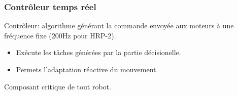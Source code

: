 \documentclass[14pt,utf8,hyperref={pdfpagelabels=false}]{beamer}
\begin{document}
\begin{slideAction}
  \frametitle{Contrôleur temps réel}


  \begin{changeleftmargin}{1.1cm}
  \begin{center}
    Contrôleur: algorithme générant la commande envoyée aux moteurs à
    une fréquence fixe (200Hz pour HRP-2).

    \bigskip

    \begin{itemize}
    \item Exécute les tâches générées par la partie décisionelle.
    \item Permets l'adaptation réactive du mouvement.
    \end{itemize}

    \bigskip

    Composant \alert{critique} de tout robot.
  \end{center}
  \end{changeleftmargin}
\end{slideAction}
\end{document}
